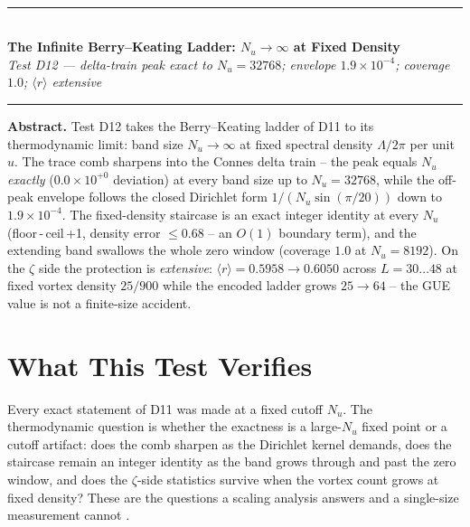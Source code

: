 \documentclass[11pt,a4paper]{article}
\begin{document}
\\[0.3em]
\rule{\textwidth}{0.8pt}\\[0.6em]
{\LARGE\bfseries\color{labblue} The Infinite Berry--Keating Ladder: $N_u \to \infty$ at Fixed Density}\\[0.5em]
{\normalsize\itshape Test D12 — delta-train peak exact to $N_u = 32768$; envelope $1.9\times10^{-4}$; coverage $1.0$; $\langle r\rangle$ extensive}\\[0.4em]
\rule{\textwidth}{0.4pt}

\begin{tcolorbox}[colback=labgreen!8, colframe=labgreen!70!black, title={Verdict: PASS — 9/9 checks}, fonttitle=\bfseries, boxrule=0.6pt]
\textbf{Abstract.} Test D12 takes the Berry--Keating ladder of D11 to its thermodynamic limit: band size $N_u \to \infty$ at fixed spectral density $\Lambda/2\pi$ per unit $u$. The trace comb sharpens into the Connes delta train -- the peak equals $N_u$ \emph{exactly} ($0.0\times10^{+0}$ deviation) at every band size up to $N_u = 32768$, while the off-peak envelope follows the closed Dirichlet form $1/(N_u\sin(\pi/20))$ down to $1.9\times10^{-4}$. The fixed-density staircase is an exact integer identity at every $N_u$ (floor$\,$-$\,$ceil$\,$+1, density error $\le 0.68$ -- an $O(1)$ boundary term), and the extending band swallows the whole zero window (coverage $1.0$ at $N_u = 8192$). On the $\zeta$ side the protection is \emph{extensive}: $\langle r\rangle = 0.5958 \to 0.6050$ across $L = 30\ldots48$ at fixed vortex density $25/900$ while the encoded ladder grows $25 \to 64$ -- the GUE value is not a finite-size accident.
\end{tcolorbox}

\section{What This Test Verifies}
Every exact statement of D11 was made at a fixed cutoff $N_u$. The thermodynamic question is whether the exactness is a large-$N_u$ fixed point or a cutoff artifact: does the comb sharpen as the Dirichlet kernel demands, does the staircase remain an integer identity as the band grows through and past the zero window, and does the $\zeta$-side statistics survive when the vortex count grows at fixed density? These are the questions a scaling analysis answers and a single-size measurement cannot \cite{berrykeating,connes}.
\end{document}
